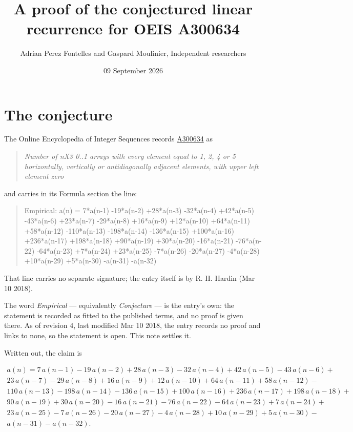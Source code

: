 \documentclass[11pt]{article}
\title{A proof of the conjectured linear recurrence for OEIS A300634}
\author{Adrian Perez Fontelles and Gaspard Moulinier, Independent researchers}
\date{09 September 2026}
\theoremstyle{definition}
\begin{document}
\maketitle
\section{The conjecture}

The Online Encyclopedia of Integer Sequences records \href{https://oeis.org/A300634}{A300634} as

\begin{quote}\itshape Number of nX3 0..1 arrays with every element equal to 1, 2, 4 or 5 horizontally, vertically or antidiagonally adjacent elements, with upper left element zero\end{quote}

and carries in its Formula section the line:

\begin{quote}\ttfamily Empirical: a(n) = 7*a(n-1) -19*a(n-2) +28*a(n-3) -32*a(n-4) +42*a(n-5) -43*a(n-6) +23*a(n-7) -29*a(n-8) +16*a(n-9) +12*a(n-10) +64*a(n-11) +58*a(n-12) -110*a(n-13) -198*a(n-14) -136*a(n-15) +100*a(n-16) +236*a(n-17) +198*a(n-18) +90*a(n-19) +30*a(n-20) -16*a(n-21) -76*a(n-22) -64*a(n-23) +7*a(n-24) +23*a(n-25) -7*a(n-26) -20*a(n-27) -4*a(n-28) +10*a(n-29) +5*a(n-30) -a(n-31) -a(n-32)\end{quote}

That line carries no separate signature; the entry itself is by R. H. Hardin (Mar 10 2018).

The word {\itshape Empirical} --- equivalently {\itshape Conjecture} --- is the entry's own: the statement is recorded as fitted to the published terms, and no proof is given there. As of revision 4, last modified Mar 10 2018, the entry records no proof and links to none, so the statement is open. This note settles it.

Written out, the claim is

\begin{multline*} a(n) = 7\,a(n-1) - 19\,a(n-2) + 28\,a(n-3) - 32\,a(n-4) + 42\,a(n-5) - 43\,a(n-6) + \\ 23\,a(n-7) - 29\,a(n-8) + 16\,a(n-9) + 12\,a(n-10) + 64\,a(n-11) + 58\,a(n-12) - \\ 110\,a(n-13) - 198\,a(n-14) - 136\,a(n-15) + 100\,a(n-16) + 236\,a(n-17) + 198\,a(n-18) + \\ 90\,a(n-19) + 30\,a(n-20) - 16\,a(n-21) - 76\,a(n-22) - 64\,a(n-23) + 7\,a(n-24) + \\ 23\,a(n-25) - 7\,a(n-26) - 20\,a(n-27) - 4\,a(n-28) + 10\,a(n-29) + 5\,a(n-30) - \\ a(n-31) - a(n-32). \end{multline*}
\end{document}
